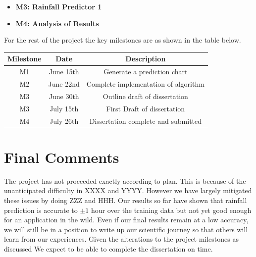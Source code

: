 \documentclass[11pt, a4paper]{article}
\begin{document}
\begin{itemize}
    \item{\bf M3: Rainfall Predictor 1}
    \item{\bf M4: Analysis of Results}

\end{itemize}

For the rest of the project the key milestones are as shown in the table below.
\begin{center}
\begin{tabular}{ccc} \hline
    Milestone & Date & Description \\ \hline 
    M1 & June 15th & Generate a prediction chart \\ \hline
    M2 & June 22nd & Complete implementation of algorithm \\ \hline
    M3 & June 30th & Outline draft of dissertation \\ \hline
    M3 & July 15th & First Draft of dissertation \\ \hline
    M4 & July 26th & Dissertation complete and submitted \\ \hline
\end{tabular}
\end{center}

\section{Final Comments}
The project has not proceeded exactly according to plan. This is because of the unanticipated difficulty in XXXX and YYYY. However we have largely mitigated these issues by doing ZZZ and HHH. Our results so far have shown that rainfall prediction is accurate to $\pm 1$ hour over the training data but not yet good enough for an application in the wild. Even if our final results remain at a low accuracy, we will still be in a position to write up our scientific journey so that others will learn from our experiences. Given the alterations to the project milestones as discussed We expect to be able to complete the dissertation on time.




\end{document}
